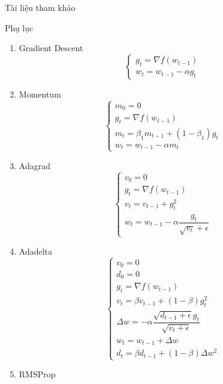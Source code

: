 \documentclass[10pt]{beamer}
\theoremstyle{remark}
\theoremstyle{definition}
\begin{document}
\begin{frame}[allowframebreaks]{Tài liệu tham khảo}
    \printbibliography
\end{frame}

\begin{frame}[allowframebreaks]{Phụ lục}
	\begin{enumerate}
		\item  Gradient Descent
		\begin{equation*}
			\begin{cases}g_t = \nabla f(w_{t-1}) \\ w_t = w_{t-1} - \alpha g_t\end{cases}
		\end{equation*}
		\item Momentum
		\begin{equation*}
			\begin{cases}m_0 = 0 \\ g_t = \nabla f(w_{t-1}) 
				\\ m_t = \beta_1 m_{t-1} + (1-\beta_1)g_t\\ w_t = w_{t-1} - \alpha m_t\end{cases}
		\end{equation*}
		\item Adagrad
		\begin{equation*}
			\begin{cases}v_0 = 0\\ g_t = \nabla f(w_{t-1}) \\ v_t = v_{t-1} + g_t^2 \\ w_t = w_{t-1} - \alpha \dfrac{g_t}{\sqrt{v_t} + \epsilon} \end{cases}
		\end{equation*}
		\item Adadelta
		\begin{equation*}
			\begin{cases}v_0 = 0\\d_0 = 0 \\ g_t = \nabla f(w_{t-1}) \\ v_t = \beta v_{t-1} + (1-\beta)g_t^2 \\ \Delta w = - \alpha \dfrac{\sqrt{d_{t-1} + \epsilon}g_t}{\sqrt{v_t + \epsilon}} \\ w_t = w_{t-1} + \Delta w \\ d_t = \beta d_{t-1} + (1 - \beta) \Delta w^2 \end{cases}
		\end{equation*}
		\item RMSProp
		\begin{equation*}

\end{equation*}
\end{enumerate}
\end{frame}
\end{document}
